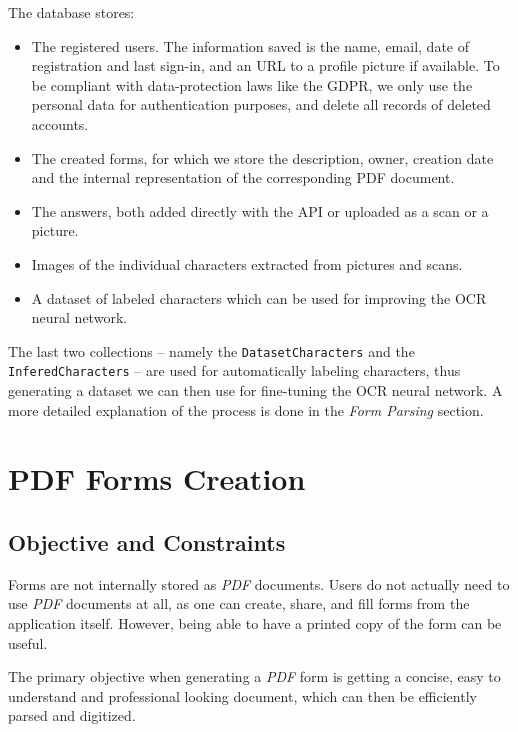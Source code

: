 \documentclass[11pt, a4paper]{report}
\def\code#1{\texttt{#1}}
\begin{document}
The database stores:
\begin{itemize}
    \item The registered users. The information saved is the name, email, date of registration and last sign-in, and an URL to a profile picture if available. To be compliant with data-protection laws like the GDPR, we only use the personal data for authentication purposes, and delete all records of deleted accounts.
    \item The created forms, for which we store the description, owner, creation date and the internal representation of the corresponding PDF document.
    \item The answers, both added directly with the API or uploaded as a scan or a picture.
    \item Images of the individual characters extracted from pictures and scans.
    \item A dataset of labeled characters which can be used for improving the OCR neural network.
\end{itemize}


The last two collections -- namely the \code{DatasetCharacters} and the \code{InferedCharacters} -- are used for automatically labeling characters, thus generating a dataset we can then use for fine-tuning the OCR neural network. A more detailed explanation of the process is done in the \textit{Form Parsing} section.


\chapter{PDF Forms Creation}
\label{chapter-pdf-form-creation}

\section{Objective and Constraints}

Forms are not internally stored as \textit{PDF} documents. Users do not actually need to use \textit{PDF} documents at all, as one can create, share, and fill forms from the application itself. However, being able to have a printed copy of the form can be useful.

The primary objective when generating a \textit{PDF} form is getting a concise, easy to understand and professional looking document, which can then be efficiently parsed and digitized.
\end{document}
